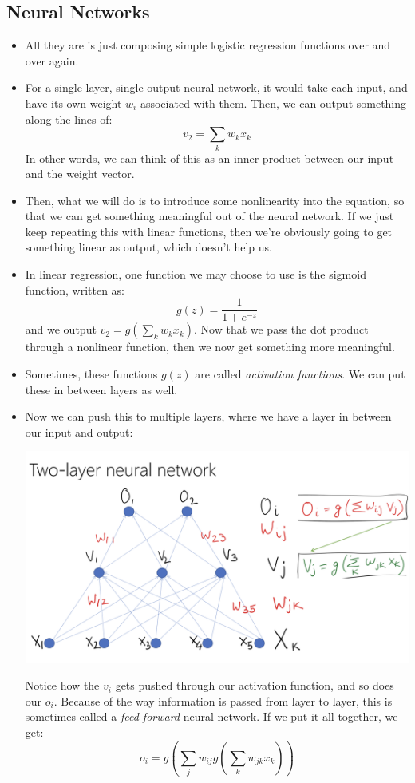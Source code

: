 \subsection{Neural Networks}
\begin{itemize}
	\item All they are is just composing simple logistic regression functions over
		and over again.  
	\item For a single layer, single output neural network, it would take each input,
		and have its own weight \( w_i \) associated with them. Then, we can output
		something along the lines of:
		\[
			v_2 = \sum_k w_{k}x_k 
		\]
		In other words, we can think of this as an inner product between our input
		and the weight vector.   
	\item Then, what we will do is to introduce some nonlinearity into the equation,
		so that we can get something meaningful out of the neural network. If we just
		keep repeating this with linear functions, then we're obviously going to get
		something linear as output, which doesn't help us.
	\item In linear regression, one function we may choose to use is the sigmoid
		function, written as:
		\[
			g(z) = \frac{1}{1 + e^{-z}}
		\]
		and we output \( v_2 = g(\sum_k w_kx_k) \). Now that we pass the dot product
		through a nonlinear function, then we now get something more meaningful.
	\item Sometimes, these functions \( g(z) \) are called \textit{activation
		functions}. We can put these in between layers as well. 
	\item Now we can push this to multiple layers, where we have a layer in between
		our input and output:
		\begin{center}
			\includegraphics[scale=0.4]{lec-1b.png}
		\end{center}
		Notice how the \( v_i \) gets pushed through our activation function, and so
		does our \( o_i \). Because of the way information is passed from layer to
		layer, this is sometimes called a \textit{feed-forward} neural network.
		If we put it all together, we get:
		\[
			o_i = g\left( \sum_j w_{ij} g\left( \sum_k w_{jk} x_k \right) \right)
		\]
\end{itemize}
